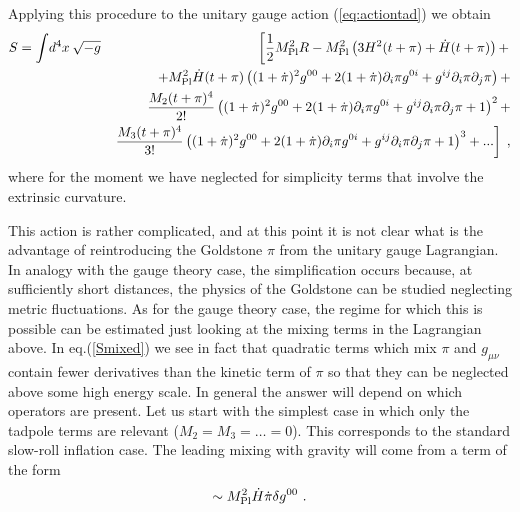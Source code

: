 \documentclass[12pt,letterpaper]{article}
\def\nn{\nonumber}
\begin{document}
{Applying this procedure to the unitary gauge action (\ref{eq:actiontad}) we obtain
\begin{eqnarray}\label{Smixed}
S = \int \! d^4 x  \: \sqrt{- g} &&\left[\frac{1}{2}M_{\rm Pl}^2 R
- M^2_{\rm Pl} \left(3H^2(t+\pi) +\dot{H}(t+\pi)\right)+ \right.\\ \nn
&&+M^2_{\rm
Pl} \dot{H}(t+\pi)\left(
(1+\dot\pi)^2g^{00}+2(1+\dot\pi)\partial_i\pi g^{0i}+
g^{ij}\partial_i\pi\partial_j\pi\right) + \\ \nonumber
&&\frac{M_2(t+\pi)^4}{2!}\left(
(1+\dot\pi)^2g^{00}+2(1+\dot\pi)\partial_i\pi g^{0i}+
g^{ij}\partial_i\pi\partial_j\pi+1\right)^2 + \nonumber\\
\nonumber && \left. \frac{M_3(t+\pi)^4}{3!}\left(
(1+\dot\pi)^2g^{00}+2(1+\dot\pi)\partial_i\pi g^{0i}+
g^{ij}\partial_i\pi\partial_j\pi+1\right)^3+ ... \right] \; ,
\end{eqnarray}
where for the moment we have neglected for simplicity terms that involve the extrinsic curvature.



This action is rather complicated, and at this point it is not clear what is the advantage of reintroducing the Goldstone $\pi$ from the unitary
gauge Lagrangian. In  analogy with the gauge theory case, the simplification occurs because, at sufficiently short distances, the physics of the Goldstone can be studied neglecting metric fluctuations. As for the gauge theory case, the regime for which this is possible can be estimated just looking at the mixing terms in the Lagrangian above. In eq.(\ref{Smixed}) we see in fact that quadratic terms which mix $\pi$ and $g_{\mu\nu}$ contain fewer derivatives than the kinetic term of $\pi$ so that they can be neglected above some high energy scale. In general the answer will depend on which operators are present.
Let us start with the simplest case in which only the tadpole terms are relevant ($M_2=M_3=\ldots=0$). This corresponds to the standard slow-roll inflation case. The leading mixing
with gravity will come from a term of the form
\begin{equation}
\sim M_{\rm Pl}^2 \dot H \dot\pi \delta g^{00} \ .
\end{equation}


}
\end{document}
